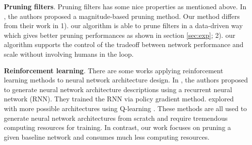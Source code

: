 \documentclass[10pt,twocolumn,letterpaper]{article}
\begin{document}
\textbf{Pruning filters}. Pruning filters has some nice properties as mentioned above. In \cite{iclr17}, the authors proposed a magnitude-based pruning method. Our method differs from their work in 1). our algorithm is able to prune filters in a data-driven way which gives better pruning performances as shown in section \ref{sec:exp}; 2). our algorithm supports the control of the tradeoff between network performance and scale without involving humans in the loop.

\textbf{Reinforcement learning}. There are some works applying reinforcement learning methods to neural network architecture design. In \cite{ns}, the authors proposed to generate neural network architecture descriptions using a recurrent neural network (RNN). They trained the RNN via policy gradient method. \cite{nd} explored with more possible architectures using Q-learning \cite{Q1, Q2}. These methods are all used to generate neural network architectures from scratch and require tremendous computing resources for training. In contrast, our work focuses on pruning a given baseline network and consumes much less computing resources. 
\end{document}
